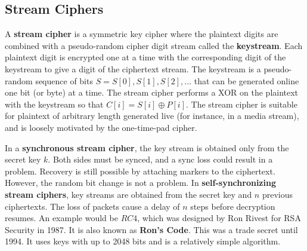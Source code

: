 \documentclass[11pt]{article}
\theoremstyle{plain} %
\theoremstyle{definition}
\theoremstyle{example}
\theoremstyle{remark}
\begin{document}
\subsection{Stream Ciphers}
A \textbf{stream cipher} is a symmetric key cipher where the plaintext digits are combined with a pseudo-random cipher digit stream called the \textbf{keystream}. Each plaintext digit is encrypted one at a time with the corresponding digit of the keystream to give a digit of the ciphertext stream. The keystream is a pseudo-random sequence of bits $S = S[0], S[1], S[2], ...$ that can be generated online one bit (or byte) at a time. The stream cipher performs a XOR on the plaintext with the keystream so that $C[i] = S[i] \oplus P[i]$. The stream cipher is suitable for plaintext of arbitrary length generated live (for instance, in a media stream), and is loosely motivated by the one-time-pad cipher. 

In a \textbf{synchronous stream cipher}, the key stream is obtained only from the secret key $k$. Both sides must be synced, and a sync loss could result in a problem. Recovery is still possible by attaching markers to the ciphertext. However, the random bit change is not a problem. In \textbf{self-synchronizing stream ciphers}, key streams are obtained from the secret key and $n$ previous ciphertexts. The loss of packets cause a delay of $n$ steps before decryption resumes. An example would be $RC4$, which was designed by Ron Rivest for RSA Security in 1987. It is also known as \textbf{Ron's Code}. This was a trade secret until 1994. It uses keys with up to 2048 bits and is a relatively simple algorithm. 
\end{document}
